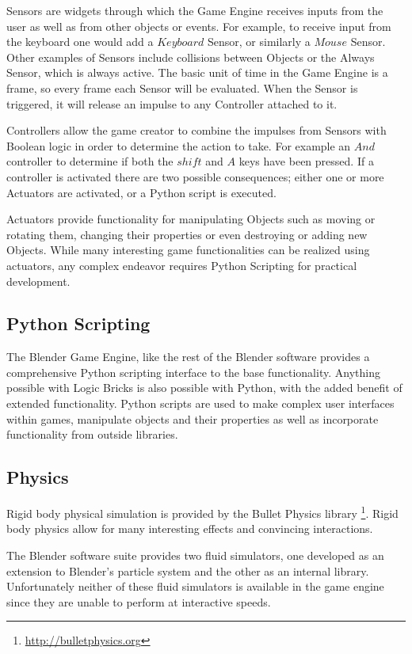 Sensors are widgets through which the Game Engine receives inputs from the user
as well as from other objects or events. For example, to receive input from the
keyboard one would add a $Keyboard$ Sensor, or similarly a $Mouse$ Sensor.
Other examples of Sensors include collisions between Objects or the Always
Sensor, which is always active. The basic unit of time in the Game Engine is a
frame, so every frame each Sensor will be evaluated. When the Sensor is
triggered, it will release an impulse to any Controller attached to it.


Controllers allow the game creator to combine the impulses from Sensors with
Boolean logic in order to determine the action to take. For example an $And$
controller to determine if both the $shift$ and $A$ keys have been pressed. If
a controller is activated there are two possible consequences; either one or
more Actuators are activated, or a Python script is executed.


Actuators provide functionality for manipulating Objects such as moving or
rotating them, changing their properties or even destroying or adding new
Objects. While many interesting game functionalities can be realized using
actuators, any complex endeavor requires Python Scripting for practical
development.

\subsection{Python Scripting}
The Blender Game Engine, like the rest of the Blender software provides a
comprehensive Python scripting interface to the base functionality. Anything
possible with Logic Bricks is also possible with Python, with the added benefit
of extended functionality. Python scripts are used to make complex user
interfaces within games, manipulate objects and their properties as well as
incorporate functionality from outside libraries.


\subsection{Physics}
Rigid body physical simulation is provided by the Bullet Physics library
\footnote{\url{http://bulletphysics.org}}. Rigid body physics allow for many
interesting effects and convincing interactions. 

The Blender software suite provides two fluid simulators, one developed as an
extension to Blender's particle system and the other as an internal library.
Unfortunately neither of these fluid simulators is available in the game engine
since they are unable to perform at interactive speeds.



